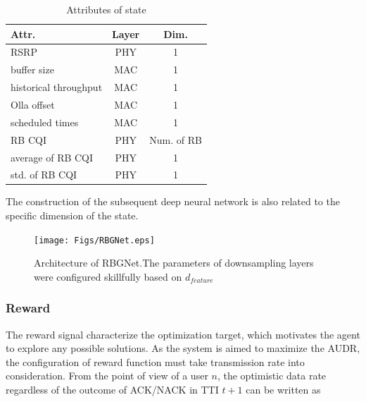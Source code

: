 \documentclass[conference,compsocconf]{IEEEtran}
\begin{document}
\begin{table}[H]
	\caption{Attributes of state}\label{tb:1}
	\centering
	\begin{tabular}{lcc}
		\hline
		Attr.                    & Layer   & Dim.       \\ \hline
		RSRP                    & PHY & 1         \\
		buffer size             & MAC & 1         \\
		historical throughput        & MAC & 1         \\
		Olla offset             & MAC & 1         \\
		scheduled times         & MAC & 1         \\
		RB CQI                  & PHY & Num. of RB \\
		average of RB CQI       & PHY & 1         \\
		std. of RB CQI          & PHY & 1         \\ \hline
	\end{tabular}
\end{table}

The construction of the subsequent deep neural network is also related to the specific dimension of the state.


\begin{figure}[htp]
	\centering
	\texttt{[image: Figs/RBGNet.eps]}
	\caption{Architecture of RBGNet.The parameters of downsampling layers were configured skillfully based on $ d_{feature} $}\label{fig:arch}
\end{figure}
\subsubsection{Reward}
The reward signal characterize the optimization target, which motivates the agent to explore any possible solutions. As the system is aimed to maximize the AUDR, the configuration of reward function must take transmission rate into consideration. From the point of view of a user $n$, the optimistic data rate regardless of the outcome of ACK/NACK in TTI $t+1$ can be written as
\end{document}
